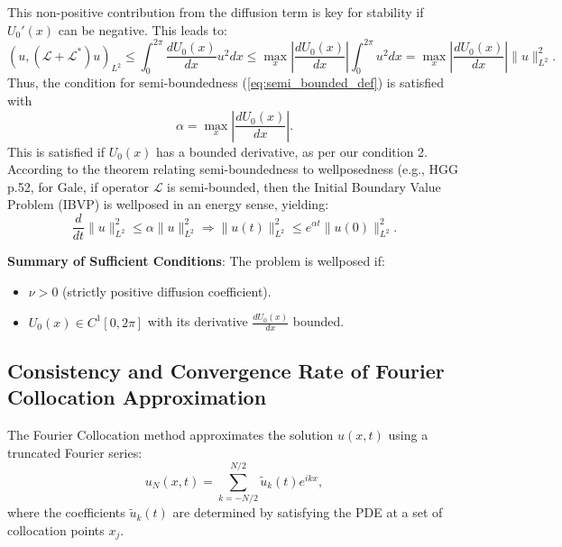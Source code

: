 This non-positive contribution from the diffusion term is key for stability if $U_0'(x)$ can be negative. This leads to:
\begin{equation}
    (u, (\mathcal{L}+\mathcal{L}^*)u)_{L^2} \leq \int_0^{2\pi} \frac{dU_0(x)}{dx}u^2 dx \leq  \max_x\left|\frac{dU_0(x)}{dx}\right| \int_0^{2\pi} u^2 dx = \max_x\left|\frac{dU_0(x)}{dx}\right| \|u\|^2_{L^2}.
    \label{eq:wellposed_cond_deriv}
\end{equation}
Thus, the condition for semi-boundedness (\ref{eq:semi_bounded_def}) is satisfied with
\begin{equation}
    \alpha = \max_x\left|\frac{dU_0(x)}{dx}\right|.
    \label{eq:alpha_val}
\end{equation}
This is satisfied if $U_0(x)$ has a bounded derivative, as per our condition 2.
According to the theorem relating semi-boundedness to wellposedness (e.g., HGG p.52, for Gale, if operator $\mathcal{L}$ is semi-bounded, then the Initial Boundary Value Problem (IBVP) is wellposed in an energy sense, yielding:
\begin{equation}
    \frac{d}{d t}\|u\|_{L^2}^2 \leq \alpha\|u\|_{L^2}^2 \Rightarrow\|u(t)\|_{L^2}^2 \leq e^{\alpha t}\|u(0)\|_{L^2}^2.
    \label{eq:wellposed_result}
\end{equation}

\textbf{Summary of Sufficient Conditions}: The problem is wellposed if:
\begin{itemize}
    \item $\nu > 0$ (strictly positive diffusion coefficient).
    \item $U_0(x) \in C^1[0,2\pi]$ with its derivative $\frac{dU_0(x)}{dx}$ bounded.
\end{itemize}

\subsection{Consistency and Convergence Rate of Fourier Collocation Approximation}\label{sub:consistency_and_convergence_rate_of_fourier_collocation_approximation}

The Fourier Collocation method approximates the solution $u(x,t)$ using a truncated Fourier series:
\begin{equation}
u_N(x,t) = \sum_{k=-N/2}^{N/2} \tilde{u}_k(t) e^{ikx},
\label{eq:fourier_approx}
\end{equation}
where the coefficients $\tilde{u}_k(t)$ are determined by satisfying the PDE at a set of collocation points $x_j$.


